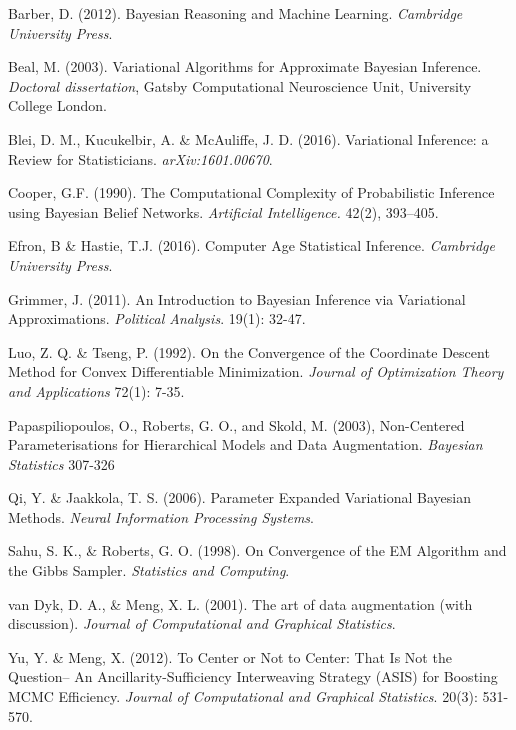 \documentclass{article}
\begin{document}
\begin{thebibliography}{10}

 Barber, D. (2012). Bayesian Reasoning and Machine Learning. {\sl Cambridge University Press}.

 Beal, M. (2003). Variational Algorithms for Approximate Bayesian Inference. {\sl Doctoral dissertation}, Gatsby Computational Neuroscience Unit, University College London.

 Blei, D. M., Kucukelbir, A. \& McAuliffe, J. D. (2016). Variational Inference: a Review for Statisticians. {\itshape arXiv:1601.00670}.

 Cooper, G.F. (1990). The Computational Complexity of Probabilistic Inference using Bayesian Belief Networks. {\sl Artificial Intelligence.} 42(2), 393–405.

 Efron, B \& Hastie, T.J. (2016). Computer Age Statistical Inference. {\itshape Cambridge University Press}.

 Grimmer, J. (2011). An Introduction to Bayesian Inference via Variational Approximations. {\itshape Political Analysis}. 19(1): 32-47.

 Luo, Z. Q. \& Tseng, P. (1992). On the Convergence of the Coordinate Descent Method for Convex Differentiable Minimization. {\itshape Journal of Optimization Theory and Applications} 72(1): 7-35. 

 Papaspiliopoulos, O., Roberts, G. O., and Skold, M. (2003), Non-Centered Parameterisations for Hierarchical Models and Data Augmentation. {\sl Bayesian Statistics} 307-326

 Qi, Y. \& Jaakkola, T. S. (2006). Parameter Expanded Variational Bayesian Methods. {\itshape Neural Information Processing Systems}. 

 Sahu, S. K., \& Roberts, G. O. (1998). On Convergence of the EM Algorithm and the Gibbs Sampler. {\sl Statistics
and Computing}. 

 van Dyk, D. A., \& Meng, X. L. (2001). The art of data augmentation (with discussion). {\sl Journal of Computational and Graphical Statistics}.

 Yu, Y. \& Meng, X. (2012). To Center or Not to Center: That Is Not the
Question-- An Ancillarity-Sufficiency Interweaving Strategy (ASIS) for Boosting MCMC Efficiency. {\itshape Journal of Computational and Graphical Statistics}. 20(3): 531-570. 
\end{thebibliography}
\end{document}
